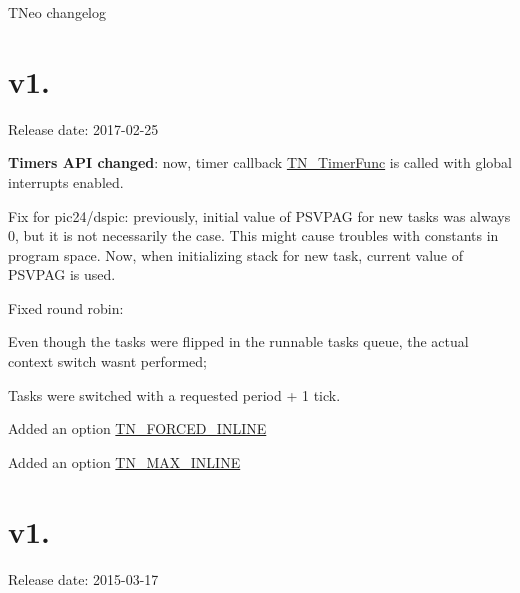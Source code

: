 T\+Neo changelog\hypertarget{changelog_changelog_v1_08}{}\section{v1.}\label{changelog_changelog_v1_08}
Release date\+: 2017-\/02-\/25


\begin{DoxyItemize}
\item {\bfseries Timers A\+PI changed}\+: now, timer callback {\ttfamily \hyperlink{tn__timer_8h_a3139b6e571f7bd3d304a7bb87b5b2459}{T\+N\+\_\+\+Timer\+Func}} is called with global interrupts enabled.
\item Fix for pic24/dspic\+: previously, initial value of P\+S\+V\+P\+AG for new tasks was always 0, but it is not necessarily the case. This might cause troubles with constants in program space. Now, when initializing stack for new task, current value of P\+S\+V\+P\+AG is used.
\item Fixed round robin\+:
\begin{DoxyItemize}
\item Even though the tasks were flipped in the runnable tasks queue, the actual context switch wasn\textquotesingle{}t performed;
\item Tasks were switched with a requested period + 1 tick.
\end{DoxyItemize}
\item Added an option {\ttfamily \hyperlink{tn__cfg__default_8h_a55cf98b6d6de554b433f497f62c2b363}{T\+N\+\_\+\+F\+O\+R\+C\+E\+D\+\_\+\+I\+N\+L\+I\+NE}}
\item Added an option {\ttfamily \hyperlink{tn__cfg__default_8h_a50a44e397e61bf00e33ebb25ac417c56}{T\+N\+\_\+\+M\+A\+X\+\_\+\+I\+N\+L\+I\+NE}}
\end{DoxyItemize}\hypertarget{changelog_changelog_v1_07}{}\section{v1.}\label{changelog_changelog_v1_07}
Release date\+: 2015-\/03-\/17



